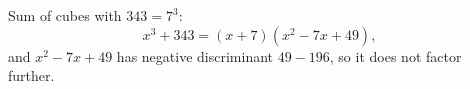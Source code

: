 Sum of cubes with $343=7^3$:
\[x^3+343=\boxed{(x+7)\left(x^2-7x+49\right)},\]
and $x^2-7x+49$ has negative discriminant $49-196$, so it does not factor further.
